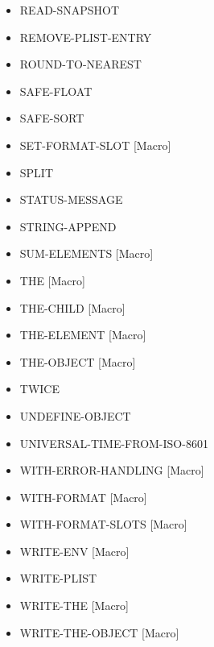 \documentclass [11pt]{book}
\begin{document}
\begin{itemize}
\item {}READ-SNAPSHOT

\item {}REMOVE-PLIST-ENTRY

\item {}ROUND-TO-NEAREST

\item {}SAFE-FLOAT

\item {}SAFE-SORT

\item {}SET-FORMAT-SLOT [Macro]

\item {}SPLIT

\item {}STATUS-MESSAGE

\item {}STRING-APPEND

\item {}SUM-ELEMENTS [Macro]

\item {}THE [Macro]

\item {}THE-CHILD [Macro]

\item {}THE-ELEMENT [Macro]

\item {}THE-OBJECT [Macro]

\item {}TWICE

\item {}UNDEFINE-OBJECT

\item {}UNIVERSAL-TIME-FROM-ISO-8601

\item {}WITH-ERROR-HANDLING [Macro]

\item {}WITH-FORMAT [Macro]

\item {}WITH-FORMAT-SLOTS [Macro]

\item {}WRITE-ENV [Macro]

\item {}WRITE-PLIST

\item {}WRITE-THE [Macro]

\item {}WRITE-THE-OBJECT [Macro]

\end{itemize}
\end{document}
